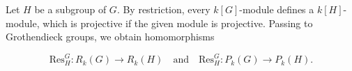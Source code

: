 Let $H$ be a subgroup of $G$. By restriction, every $k[G]$-module defines a $k[H]$-module, which is projective if the given module is projective. Passing to Grothendieck groups, we obtain homomorphisms

$$\text{Res}_H^G: R_k(G) \rightarrow R_k(H) \quad \text{and} \quad \text{Res}_H^G: P_k(G) \rightarrow P_k(H).$$
